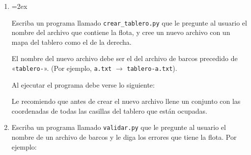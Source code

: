 \documentclass[12pt,spanish]{article}
\begin{document}
  \begin{enumerate}[leftmargin=0pt]

    \item
      \begin{minipage}[t]{0.6\textwidth}
        \parskip=2ex

        Escriba un programa llamado \verb+crear_tablero.py+
        que le pregunte al usuario
        el nombre del archivo que contiene la flota,
        y cree un nuevo archivo con un mapa del tablero
        como el de la derecha.

        El nombre del nuevo archivo debe ser el del archivo de barcos
        precedido de «\verb+tablero-+».
        (Por ejemplo, \verb+a.txt+ \(\to\) \verb+tablero-a.txt+).

        Al ejecutar el programa debe verse lo siguiente:

        
      \end{minipage}
      \hfill
      \begin{minipage}[t]{0.35\textwidth}
        
      \end{minipage}

      Le recomiendo que antes de crear el nuevo archivo
      llene un conjunto con las coordenadas de todas las casillas del tablero
      que están ocupadas.

    \item
      Escriba un programa llamado \verb+validar.py+
      que le pregunte al usuario el nombre de un archivo de barcos
      y le diga los errores que tiene la flota.
      Por ejemplo:
      

  \end{enumerate}
\end{document}

